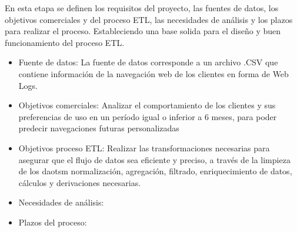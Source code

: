 En esta etapa se definen los requisitos del proyecto, las fuentes de datos, los objetivos comerciales y del proceso ETL, las necesidades de análisis y los plazos para realizar el proceso. Estableciendo una base solida para el diseño y buen funcionamiento del proceso ETL.
\begin{itemize}
    \item Fuente de datos: La fuente de datos corresponde a un archivo .CSV que contiene información de la navegación web de los clientes en forma de Web Logs.
    \item Objetivos comerciales: Analizar el comportamiento de los clientes y sus preferencias de uso en un período igual o inferior a 6 meses, para poder predecir navegaciones futuras personalizadas
    \item Objetivos proceso ETL: Realizar las transformaciones necesarias para asegurar que el flujo de datos sea eficiente y preciso, a través de la limpieza de los daotsm normalización, agregación, filtrado, enriquecimiento de datos, cálculos y derivaciones necesarias.
    \item Necesidades de análisis:
    \item Plazos del proceso:
\end{itemize}
